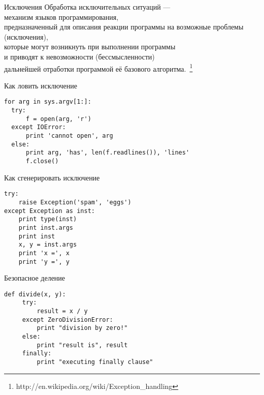 \documentclass[hyperref={pdftex,unicode}]{beamer}
\begin{document}
\begin{frame}{Исключения}
Обработка исключительных ситуаций --- \\
механизм языков программирования, \\
предназначенный для описания реакции программы на возможные проблемы (исключения), \\
которые могут возникнуть при выполнении программы \\
и приводят к невозможности (бессмысленности) \\
дальнейшей отработки программой её базового алгоритма.~\footnote[frame]{
http://en.wikipedia.org/wiki/Exception\_handling}
\end{frame}

\begin{frame}[fragile]{Как ловить исключение}
  \begin{lstlisting}
for arg in sys.argv[1:]:
  try:
      f = open(arg, 'r')
  except IOError:
      print 'cannot open', arg
  else:
      print arg, 'has', len(f.readlines()), 'lines'
      f.close()
  \end{lstlisting}
\end{frame}

\begin{frame}[fragile]{Как сгенерировать исключение}
  \begin{lstlisting}
try:
    raise Exception('spam', 'eggs')
except Exception as inst:
    print type(inst)    
    print inst.args     
    print inst          
    x, y = inst.args
    print 'x =', x
    print 'y =', y
  \end{lstlisting}
\end{frame}

\begin{frame}[fragile]{Безопасное деление}
  \begin{lstlisting}
def divide(x, y):
     try:
         result = x / y
     except ZeroDivisionError:
         print "division by zero!"
     else:
         print "result is", result
     finally:
         print "executing finally clause"
  \end{lstlisting}
\end{frame}
\end{document}
